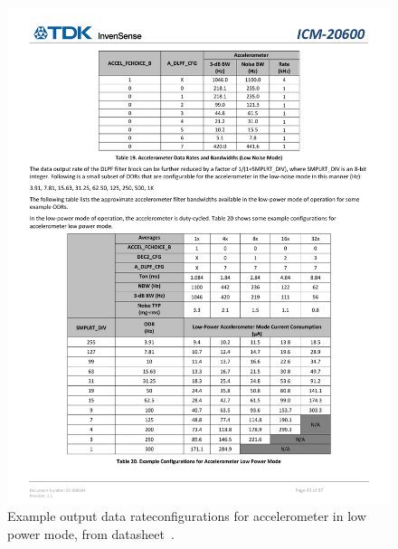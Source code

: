 \documentclass[12pt, a4paper]{report}
\begin{document}
\begin{figure}[htbp]
	\centering
	\includegraphics[width=1.1\textwidth]{
		fileForWriting/data rate seeting}
	\caption[Datasheet of the ICM20600 sensor component.]{Example output data rateconfigurations for accelerometer in low power mode, from datasheet~\cite{invensense-icm20600-datasheet}.}
	\label{fig:data-rate-config}
\end{figure}
\end{document}
